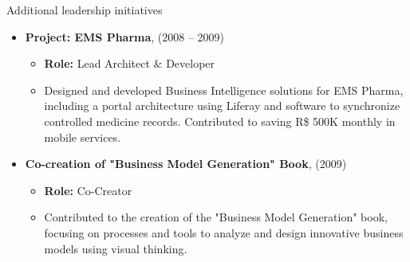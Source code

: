 \documentclass{resume} %
\begin{document}
\begin{rSection}{Additional leadership initiatives}
\begin{itemize}
    \item \textbf{Project: EMS Pharma}, \hfill (2008 -- 2009)
    \begin{itemize}
        \item \textbf{Role:} Lead Architect \& Developer
        \item Designed and developed Business Intelligence solutions for EMS Pharma, including a portal architecture using Liferay and software to synchronize controlled medicine records. Contributed to saving R\$ 500K monthly in mobile services.
    \end{itemize}

    \item \textbf{Co-creation of "Business Model Generation" Book}, \hfill  (2009)
    \begin{itemize}
        \item \textbf{Role:} Co-Creator
        \item Contributed to the creation of the "Business Model Generation" book, focusing on processes and tools to analyze and design innovative business models using visual thinking.
    \end{itemize}
\end{itemize}
\end{rSection}

\hfill \break
\end{document}
